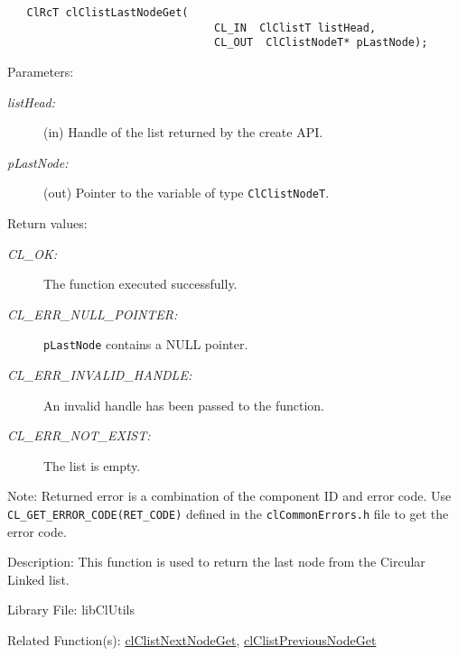 \begin{flushleft}
\begin{Desc}
\footnotesize\begin{verbatim}   ClRcT clClistLastNodeGet(
                          		CL_IN  ClClistT listHead,
                          		CL_OUT  ClClistNodeT* pLastNode);
\end{verbatim}
\normalsize
\end{Desc}
\begin{Desc}
\item[Parameters:]
\begin{description}
\item[{\em list\-Head:}](in) Handle of the list returned by the create API. 
\item[{\em p\-Last\-Node:}](out) Pointer to the variable of type {\tt{Cl\-Clist\-Node\-T}}.\end{description}
\end{Desc}
\begin{Desc}
\item[Return values:]
\begin{description}
\item[{\em CL\_\-OK:}]The function executed successfully. 
\item[{\em CL\_\-ERR\_\-NULL\_\-POINTER:}]{\tt{pLastNode}} contains a NULL pointer. 
\item[{\em CL\_\-ERR\_\-INVALID\_\-HANDLE:}]An invalid handle has been passed to the function.
\item[{\em CL\_\-ERR\_\-NOT\_\-EXIST:}]The list is empty.\end{description}
\end{Desc}
\begin{Desc}
\item[Note:]Returned error is a combination of the component ID and error code. Use {\tt{CL\_\-GET\_\-ERROR\_\-CODE(RET\_\-CODE)}} defined in
the {\tt{clCommonErrors.h}} file to get the error code.\end{Desc}
\begin{Desc}
\item[Description:]This function is used to return the last node from the Circular Linked list.\end{Desc}
\begin{Desc}
\item[Library File:]lib\-Cl\-Utils\end{Desc}
\begin{Desc}
\item[Related Function(s):]\hyperlink{pagecl109}{cl\-Clist\-Next\-Node\-Get}, \hyperlink{pagecl110}{cl\-Clist\-Previous\-Node\-Get} \end{Desc}
\newpage


\end{flushleft}
